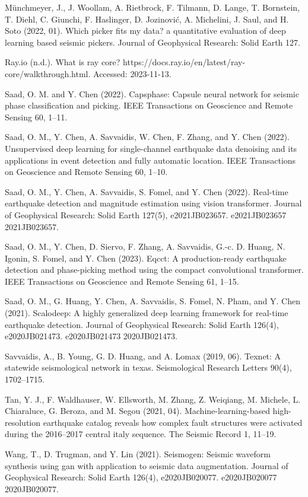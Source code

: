 Münchmeyer, J., J. Woollam, A. Rietbrock, F. Tilmann, D. Lange, T. Bornstein, T. Diehl, C. Giunchi, F. Haslinger, D. Jozinović, A. Michelini, J. Saul, and H. Soto (2022, 01). Which picker fits my data? a quantitative evaluation of deep learning based seismic pickers. Journal of Geophysical Research: Solid Earth 127.

Ray.io (n.d.). What is ray core? https://docs.ray.io/en/latest/ray-core/walkthrough.html. Accessed: 2023-11-13.

Saad, O. M. and Y. Chen (2022). Capsphase: Capsule neural network for seismic phase classification and picking. IEEE Transactions on Geoscience and Remote Sensing 60, 1–11.

Saad, O. M., Y. Chen, A. Savvaidis, W. Chen, F. Zhang, and Y. Chen (2022). Unsupervised deep learning for single-channel earthquake data denoising and its applications in event detection and fully automatic location. IEEE Transactions on Geoscience and Remote Sensing 60, 1–10.

Saad, O. M., Y. Chen, A. Savvaidis, S. Fomel, and Y. Chen (2022). Real-time earthquake detection and magnitude estimation using vision transformer. Journal of Geophysical Research: Solid Earth 127(5), e2021JB023657. e2021JB023657 2021JB023657.

Saad, O. M., Y. Chen, D. Siervo, F. Zhang, A. Savvaidis, G.-c. D. Huang, N. Igonin, S. Fomel, and Y. Chen (2023). Eqcct: A production-ready earthquake detection and phase-picking method using the compact convolutional transformer. IEEE Transactions on Geoscience and Remote Sensing 61, 1–15.

Saad, O. M., G. Huang, Y. Chen, A. Savvaidis, S. Fomel, N. Pham, and Y. Chen (2021). Scalodeep: A highly generalized deep learning framework for real-time earthquake detection. Journal of Geophysical Research: Solid Earth 126(4), e2020JB021473. e2020JB021473 2020JB021473.

Savvaidis, A., B. Young, G. D. Huang, and A. Lomax (2019, 06). Texnet: A statewide seismological network in texas. Seismological Research Letters 90(4), 1702–1715.

Tan, Y. J., F. Waldhauser, W. Ellsworth, M. Zhang, Z. Weiqiang, M. Michele, L. Chiaraluce, G. Beroza, and M. Segou (2021, 04). Machine-learning-based high-resolution earthquake catalog reveals how complex fault structures were activated during the 2016–2017 central italy sequence. The Seismic Record 1, 11–19.

Wang, T., D. Trugman, and Y. Lin (2021). Seismogen: Seismic waveform synthesis using gan with application to seismic data augmentation. Journal of Geophysical Research: Solid Earth 126(4), e2020JB020077. e2020JB020077 2020JB020077.

